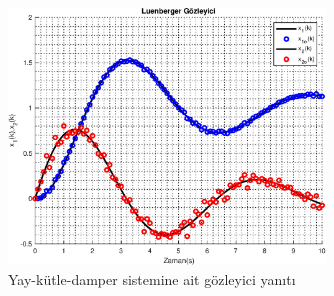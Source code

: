 \begin{figure}[!htb]
    \centering
    \includegraphics[width=0.75\textwidth]{img/lec13_plot1}
    \caption{Yay-kütle-damper sistemine ait gözleyici yanıtı}
    \label{fig:lec13_plot1}
\end{figure}